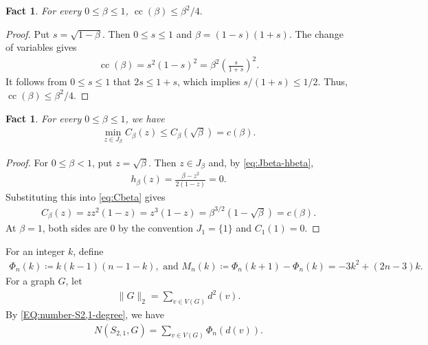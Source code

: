 \documentclass[10pt,a4paper]{article}
\newtheorem{fact}[definition]{Fact}
\newcommand{\cc}{\operatorname{cc}}
\newcommand{\normsq}[1]{\|#1\|_2}
\begin{document}
\begin{fact}\label{fact:cc-square-bound}
For every $0\le\beta\le1$,
$
  \cc(\beta)\le \beta^2/4.
$
\end{fact}


\begin{proof}
Put $s=\sqrt{1-\beta}$.  Then $0\le s\le1$ and $ \beta=(1-s)(1+s).$ The change of variables gives
\begin{align*}
  \cc(\beta)
  =s^2(1-s)^2
  =\beta^2\left(\frac{s}{1+s}\right)^2.
\end{align*}
It follows from $0\le s\le1$ that $2s\le1+s$, which implies  $s/(1+s)\le1/2$. Thus, $\cc(\beta)\le \beta^2/4$. 
\end{proof}





\begin{fact}\label{fact:qc-endpoint}
For every $0\le\beta\le1$, we have 
\begin{align*}
  \min_{z\in J_\beta} C_\beta(z)\le C_\beta(\sqrt\beta)=c(\beta).
\end{align*}
\end{fact}

\begin{proof}
For $0\le\beta<1$, put $z=\sqrt\beta$.  Then $z\in J_\beta$ and, by
\eqref{eq:Jbeta-hbeta},
\begin{align*}
  h_\beta(z)=\frac{\beta-z^2}{2(1-z)}=0.
\end{align*}
Substituting this into \eqref{eq:Cbeta} gives
\begin{align*}
  C_\beta(z)=zz^2(1-z)=z^3(1-z)=\beta^{3/2}(1-\sqrt\beta)=c(\beta).
\end{align*}
At $\beta=1$, both sides are $0$ by the convention $J_1=\{1\}$ and
$C_1(1)=0$.
\end{proof}

For an integer $k$, define 
\begin{align}\label{eq:Mndef}
 \Phi_n(k)\coloneqq k(k-1)(n-1-k), \text{ and }  M_n(k)\coloneqq\Phi_n(k+1)-\Phi_n(k)=-3k^2+(2n-3)k.
\end{align}
For a graph $G$, let 
\begin{align*}
\normsq{G}=\sum_{v\in V(G)}d^2(v). 
\end{align*}
By \eqref{EQ:number-S2,1-degree}, we have 
\begin{align}\label{EQ:number-S2,1-Phi-degree}
N(S_{2,1},G)=\sum_{v\in V(G)} \Phi_n(d(v)).
\end{align}
\end{document}
